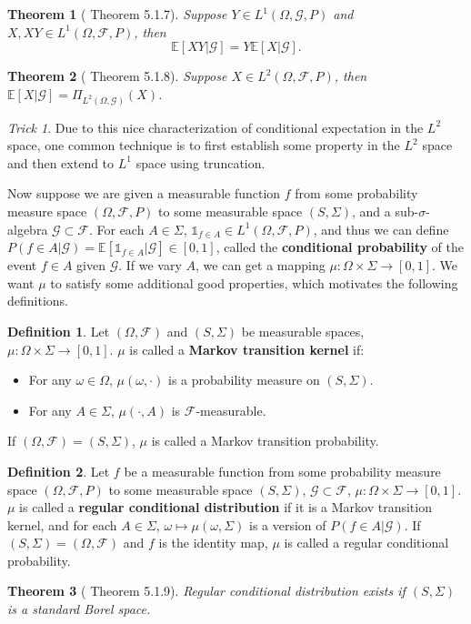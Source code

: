 \documentclass[openany]{book}
\newtheorem{theorem}{Theorem}[chapter]
\theoremstyle{definition}
\newtheorem{definition}{Definition}[chapter]
\theoremstyle{remark}
\newtheorem*{trick}{Trick}
\begin{document}
\begin{theorem}[\cite{D10} Theorem 5.1.7]
    Suppose $Y\in L^1(\Omega,\mathcal{G},P)$ and $X,XY\in L^1(\Omega,\mathcal{F},P)$, then
    \begin{equation*}
        \mathbb{E}[XY|\mathcal{G}]=Y \mathbb{E}[X|\mathcal{G}].
    \end{equation*}
\end{theorem}
\begin{theorem}[\cite{D10} Theorem 5.1.8]
    Suppose $X\in L^2(\Omega,\mathcal{F},P)$, then $\mathbb{E}[X|\mathcal{G}]=\Pi_{L^2(\Omega,\mathcal{G})}(X)$.
\end{theorem}
\begin{trick}
    Due to this nice characterization of conditional expectation in the $L^2$ space, one common technique is to first establish some property in the $L^2$ space and then extend to $L^1$ space using truncation.
\end{trick}

Now suppose we are given a measurable function $f$ from some probability measure space $(\Omega,\mathcal{F},P)$ to some measurable space $(S,\Sigma)$, and a sub-$\sigma$-algebra $\mathcal{G}\subset \mathcal{F}$. For each $A\in\Sigma$, $\mathds{1}_{f\in A}\in L^1(\Omega,\mathcal{F},P)$, and thus we can define $P(f\in A|\mathcal{G})=\mathbb{E}[\mathds{1}_{f\in A}|\mathcal{G}]\in[0,1]$, called the \textbf{conditional probability} of the event $f\in A$ given $\mathcal{G}$. If we vary $A$, we can get a mapping $\mu:\Omega\times\Sigma\to[0,1]$. We want $\mu$ to satisfy some additional good properties, which motivates the following definitions.
\begin{definition}
    Let $(\Omega,\mathcal{F})$ and $(S,\Sigma)$ be measurable spaces, $\mu:\Omega\times\Sigma\to[0,1]$.  $\mu$ is called a \textbf{Markov transition kernel} if:
    \begin{itemize}
        \item For any $\omega\in\Omega$, $\mu(\omega,\cdot)$ is a probability measure on $(S,\Sigma)$.
        \item For any $A\in\Sigma$, $\mu(\cdot,A)$ is $\mathcal{F}$-measurable.
    \end{itemize}
    If $(\Omega,\mathcal{F})=(S,\Sigma)$, $\mu$ is called a Markov transition probability.
\end{definition}
\begin{definition}
    Let $f$ be a measurable function from some probability measure space $(\Omega,\mathcal{F},P)$ to some measurable space $(S,\Sigma)$, $\mathcal{G}\subset \mathcal{F}$, $\mu:\Omega\times\Sigma\to[0,1]$. $\mu$ is called a \textbf{regular conditional distribution} if it is a Markov transition kernel, and for each $A\in\Sigma$, $\omega\mapsto\mu(\omega,\Sigma)$ is a version of $P(f\in A|\mathcal{G})$.
    If $(S,\Sigma)=(\Omega,\mathcal{F})$ and $f$ is the identity map, $\mu$ is called a regular conditional probability.
\end{definition}
\begin{theorem}[\cite{D10} Theorem 5.1.9]
    Regular conditional distribution exists if $(S,\Sigma)$ is a standard Borel space.
\end{theorem}
\end{document}
